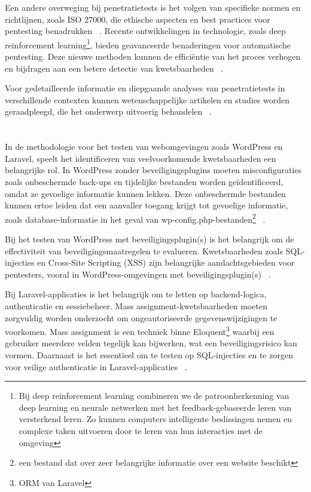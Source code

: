 Een andere overweging bij penetratietests is het volgen van specifieke normen en richtlijnen, zoals ISO 27000, die ethische 
aspecten en best practices voor pentesting benadrukken ~\autocite{DalalanaBertoglio2017}. Recente ontwikkelingen in technologie, zoals deep 
reinforcement learning\footnote{Bij deep reinforcement learning combineren we de patroonherkenning van deep learning en neurale 
netwerken met het feedback-gebaseerde leren van versterkend leren. Zo kunnen computers intelligente beslissingen nemen en complexe 
taken uitvoeren door te leren van hun interacties met de omgeving}, bieden geavanceerde benaderingen voor automatische pentesting. 
Deze nieuwe methoden kunnen de efficiëntie van het proces verhogen en bijdragen aan een betere detectie van kwetsbaarheden 
~\autocite{Yi2023}.

Voor gedetailleerde informatie en diepgaande analyses van penetratietests in verschillende contexten kunnen wetenschappelijke 
artikelen en studies worden geraadpleegd, die het onderwerp uitvoerig behandelen ~\autocite{Sarker2023}.

\section{}
\label{sec:Webomgevingen}

In de methodologie voor het testen van webomgevingen zoals WordPress en Laravel, speelt het identificeren van veelvoorkomende 
kwetsbaarheden een belangrijke rol. In WordPress zonder beveiligingsplugins moeten misconfiguraties zoals onbeschermde back-ups 
en tijdelijke bestanden worden geïdentificeerd, omdat ze gevoelige informatie kunnen lekken. Deze onbeschermde bestanden kunnen 
ertoe leiden dat een aanvaller toegang krijgt tot gevoelige informatie, zoals database-informatie in het geval van 
wp-config.php-bestanden\footnote{een bestand dat over zeer belangrijke informatie over een website beschikt} 
~\autocite{DalalanaBertoglio2017}.

Bij het testen van WordPress met beveiligingsplugin(s) is het belangrijk om de effectiviteit van beveiligingsmaatregelen te 
evalueren. Kwetsbaarheden zoals SQL-injecties en Cross-Site Scripting (XSS) zijn belangrijke aandachtsgebieden voor pentesters, 
vooral in WordPress-omgevingen met beveiligingsplugin(s) ~\autocite{Albahar2022}.

Bij Laravel-applicaties is het belangrijk om te letten op backend-logica, authenticatie en sessiebeheer. 
Mass assignment-kwetsbaarheden moeten zorgvuldig worden onderzocht om ongeautoriseerde gegevenswijzigingen te voorkomen.
Mass assignment is een techniek binne Eloquent\footnote{ORM van Laravel} waarbij een gebruiker meerdere velden tegelijk kan bijwerken, wat een beveiligingsrisico kan vormen. 
Daarnaast is het essentieel om te testen op SQL-injecties en te zorgen voor veilige authenticatie in Laravel-applicaties 
~\autocite{Altulaihan2023}.

